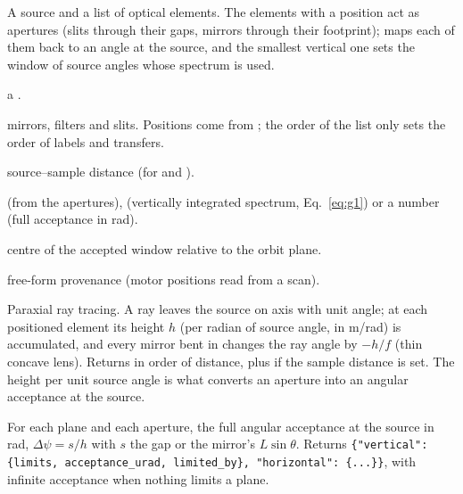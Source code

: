 A source and a list of optical elements. The elements with a position act as apertures
(slits through their gaps, mirrors through their footprint);  maps each of them
back to an angle at the source, and the smallest vertical one sets the window of source
angles whose spectrum is used.
\begin{args}
\item[source] a .
\item[optics] mirrors, filters and slits. Positions come from ; the order of
  the list only sets the order of labels and transfers.
\item[sample\_distance\_m] source--sample distance (for  and ).
\item[vertical\_acceptance]  (from the apertures),  (vertically
  integrated spectrum, Eq.~\eqref{eq:g1}) or a number (full acceptance in \textmu rad).
\item[vertical\_offset\_urad] centre of the accepted window relative to the orbit plane.
\item[settings] free-form provenance (motor positions read from a scan).
\end{args}

Paraxial ray tracing. A ray leaves the source on axis with unit angle; at each positioned
element its height $h$ (per radian of source angle, in m/rad) is accumulated, and every
mirror bent in  changes the ray angle by $-h/f$ (thin concave lens). Returns
\fn{[(element, h), ...]} in order of distance, plus  if the sample
distance is set. The height per unit source angle is what converts an aperture into an
angular acceptance at the source.

For each plane and each aperture, the full angular acceptance at the source in \textmu rad,
$\Delta\psi = s/h$ with $s$ the gap or the mirror's $L\sin\theta$. Returns
\texttt{\{"vertical": \{limits, acceptance\_urad, limited\_by\}, "horizontal": \{...\}\}}, with
infinite acceptance when nothing limits a plane.

